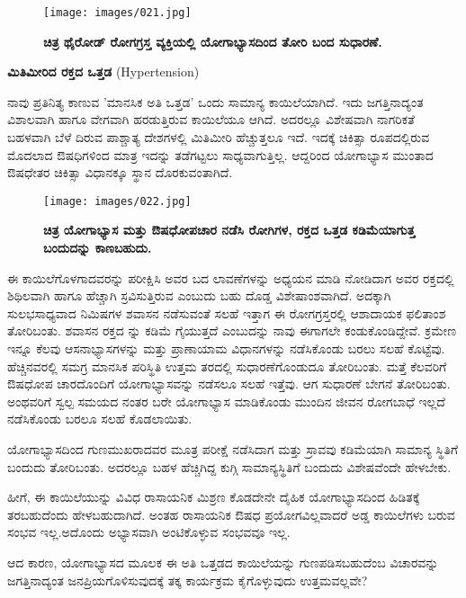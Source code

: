 \begin{figure}
\texttt{[image: images/021.jpg]}
\caption{\textbf{ಚಿತ್ರ  ಥೈರೋಡ್ ರೋಗಗ್ರಸ್ತ ವ್ಯಕ್ತಿಯಲ್ಲಿ ಯೋಗಾಭ್ಯಾಸದಿಂದ ತೋರಿ ಬಂದ ಸುಧಾರಣೆ.} }
\end{figure}

\textbf{ಮಿತಿಮೀರಿದ ರಕ್ತದ ಒತ್ತಡ} (Hypertension)

ನಾವು ಪ್ರತಿನಿತ್ಯ ಕಾಣುವ 'ಮಾನಸಿಕ ಅತಿ ಒತ್ತಡ' ಒಂದು ಸಾಮಾನ್ಯ ಕಾಯಿಲೆಯಾಗಿದೆ. ಇದು ಜಗತ್ತಿನಾದ್ಯಂತ ವಿಶಾಲವಾಗಿ ಹಾಗೂ ವೇಗವಾಗಿ ಹರಡುತ್ತಿರುವ ಕಾಯಿಲೆಯೂ ಆಗಿದೆ. ಅದರಲ್ಲೂ ವಿಶೇಷವಾಗಿ ನಾಗರಿಕತೆ ಬಹಳವಾಗಿ ಬೆಳೆ ದಿರುವ ಪಾಶ್ಚಾತ್ಯ ದೇಶಗಳಲ್ಲಿ ಮಿತಿಮೀರಿ ಹೆಚ್ಚುತ್ತಲೂ ಇದೆ. ಇದಕ್ಕೆ ಚಿಕಿತ್ಸಾ ರೂಪದಲ್ಲಿರುವ  ಮೊದಲಾದ ಔಷಧಿಗಳಿಂದ ಮಾತ್ರ ಇದನ್ನು ತಡೆಗಟ್ಟಲು ಸಾಧ್ಯವಾಗುತ್ತಿಲ್ಲ. ಆದ್ದರಿಂದ ಯೋಗಾಭ್ಯಾಸ ಮುಂತಾದ ಔಷಧೇತರ ಚಿಕಿತ್ಸಾ ವಿಧಾನಕ್ಕೂ ಸ್ಥಾನ ದೊರಕುವಂತಾಗಿದೆ.

\begin{figure}
\texttt{[image: images/022.jpg]}
\caption{\textbf{ಚಿತ್ರ  ಯೋಗಾಭ್ಯಾಸ ಮತ್ತು ಔಷಧೋಪಚಾರ ನಡೆಸಿ ರೋಗಿಗಳ, ರಕ್ತದ ಒತ್ತಡ ಕಡಿಮೆಯಾಗುತ್ತ ಬಂದುದನ್ನು ಕಾಣಬಹುದು.} }
\end{figure}

ಈ ಕಾಯಿಲೆಗೊಳಗಾದವರನ್ನು ಪರೀಕ್ಷಿಸಿ ಅವರ  ಬದ ಲಾವಣೆಗಳನ್ನು ಅಧ್ಯಯನ ಮಾಡಿ ನೋಡಿದಾಗ ಅವರ ರಕ್ತದಲ್ಲಿ ಶಿಥಿಲವಾಗಿ ಹಾಗೂ ಹೆಚ್ಚಾಗಿ ಸ್ರವಿಸುತ್ತಿರುವ  ಎಂಬುದು ಬಹು ದೊಡ್ಡ ವಿಶೇಷಾಂಶವಾಗಿದೆ. ಅದಕ್ಕಾಗಿ ಸುಲಭಸಾಧ್ಯವಾದ  ನಿಮಿಷಗಳ ಶವಾಸನ ನಡೆಸುವಂತೆ ಸಲಹೆ ಇತ್ತಾಗ ಈ ರೋಗಗ್ರಸ್ತರಲ್ಲಿ ಆಶಾದಾಯಕ ಫಲಿತಾಂಶ ತೋರಿಬಂತು. ಶವಾಸನ ರಕ್ತದ  ನ್ನು ಕಡಿಮೆ ಗೈಯುತ್ತದೆ ಎಂಬುದನ್ನು ನಾವು ಈಗಾಗಲೇ ಕಂಡುಕೊಂಡಿದ್ದೇವೆ. ಕ್ರಮೇಣ ಇನ್ನೂ ಕೆಲವು ಆಸನಾಭ್ಯಾಸಗಳನ್ನು ಮತ್ತು ಪ್ರಾಣಾಯಾಮ ವಿಧಾನಗಳನ್ನು ನಡೆಸಿಕೊಂಡು ಬರಲು ಸಲಹೆ ಕೊಟ್ಟೆವು. ಹೆಚ್ಚಿನವರಲ್ಲಿ ಸಮಗ್ರ ಮಾನಸಿಕ ಪರಿಸ್ಥಿತಿ ಉತ್ತಮ ತರದಲ್ಲಿ ಸುಧಾರಣೆಗೊಂಡುದೂ ತೋರಿಬಂತು. ಮತ್ತೆ ಕೆಲವರಿಗೆ ಔಷಧೋಪ ಚಾರದೊಂದಿಗೆ ಯೋಗಾಭ್ಯಾಸವನ್ನು ನಡೆಸಲೂ ಸಲಹೆ ಇತ್ತೆವು. ಆಗ ಸುಧಾರಣೆ ಬೇಗನೆ ತೋರಿಬಂತು. ಅಂಥವರಿಗೆ ಸ್ವಲ್ಪ ಸಮಯದ ನಂತರ ಬರೇ ಯೋಗಾಭ್ಯಾಸ ಮಾಡಿಕೊಂಡು ಮುಂದಿನ ಜೀವನ ರೋಗಬಾಧೆ ಇಲ್ಲದೆ ನಡೆಸಿಕೊಂಡು ಬರಲೂ ಸಲಹೆ ಕೊಡಲಾಯಿತು.

ಯೋಗಾಭ್ಯಾಸದಿಂದ ಗುಣಮುಖರಾದವರ ಮೂತ್ರ ಪರೀಕ್ಷೆ ನಡೆಸಿದಾಗ  ಮತ್ತು  ಸ್ರಾವವು ಕಡಿಮೆಯಾಗಿ ಸಾಮಾನ್ಯ ಸ್ಥಿತಿಗೆ ಬಂದುದು ತೋರಿಬಂತು. ಅದರಲ್ಲೂ ಬಹಳ ಹೆಚ್ಚಿಗಿದ್ದ  ಕುಗ್ಗಿ ಸಾಮಾನ್ಯಸ್ಥಿತಿಗೆ ಬಂದುದು ವಿಶೇಷವೆಂದೇ ಹೇಳಬೇಕು.

ಹೀಗೆ, ಈ ಕಾಯಿಲೆಯುನ್ನು ವಿವಿಧ ರಾಸಾಯನಿಕ ಮಿಶ್ರಣ ಕೊಡದೇನೇ ದೈಹಿಕ ಯೋಗಾಭ್ಯಾಸದಿಂದ ಹಿಡಿತಕ್ಕೆ ತರಬಹುದೆಂದು ಹೇಳಬಹುದಾಗಿದೆ. ಅಂತಹ ರಾಸಾಯನಿಕ ಔಷಧ ಪ್ರಯೋಗವಿಲ್ಲವಾದರೆ ಅಡ್ಡ ಕಾಯಿಲೆಗಳು ಬರುವ ಸಂಭವ ಇಲ್ಲ.ಅದೊಂದು ಅಭ್ಯಾಸವಾಗಿ ಅಂಟಿಕೊಳ್ಳುವ ಸಂಭವವೂ ಇಲ್ಲ.

ಆದ ಕಾರಣ, ಯೋಗಾಭ್ಯಾಸದ ಮೂಲಕ ಈ ಅತಿ ಒತ್ತಡದ ಕಾಯಿಲೆಯನ್ನು ಗುಣಪಡಿಸಬಹುದೆಂಬ ವಿಚಾರವನ್ನು ಜಗತ್ತಿನಾದ್ಯಂತ ಜನಪ್ರಿಯಗೊಳಿಸುವುದಕ್ಕೆ ತಕ್ಕ ಕಾರ್ಯಕ್ರಮ ಕೈಗೊಳ್ಳುವುದು ಉತ್ತಮವಲ್ಲವೇ?

